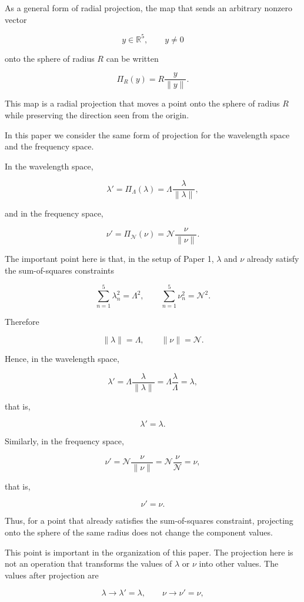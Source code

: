 \documentclass[
]{article}
\begin{document}
As a general form of radial projection, the map that sends an arbitrary
nonzero vector

\[
y\in\mathbb{R}^5,\qquad y\ne0
\]

onto the sphere of radius \(R\) can be written

\[
\Pi_R(y)=R\frac{y}{\|y\|} .
\]

This map is a radial projection that moves a point onto the sphere of
radius \(R\) while preserving the direction seen from the origin.

In this paper we consider the same form of projection for the wavelength
space and the frequency space.

In the wavelength space,

\[
\lambda'=\Pi_\Lambda(\lambda)
=
\Lambda\frac{\lambda}{\|\lambda\|} ,
\]

and in the frequency space,

\[
\nu'=\Pi_{\mathcal{N}}(\nu)
=
\mathcal{N}\frac{\nu}{\|\nu\|} .
\]

The important point here is that, in the setup of Paper 1, \(\lambda\)
and \(\nu\) already satisfy the sum-of-squares constraints

\[
\sum_{n=1}^{5}\lambda_n^2=\Lambda^2,
\qquad
\sum_{n=1}^{5}\nu_n^2=\mathcal{N}^2 .
\]

Therefore

\[
\|\lambda\|=\Lambda,
\qquad
\|\nu\|=\mathcal{N} .
\]

Hence, in the wavelength space,

\[
\lambda'
=
\Lambda\frac{\lambda}{\|\lambda\|}
=
\Lambda\frac{\lambda}{\Lambda}
=
\lambda ,
\]

that is,

\[
\boxed{\lambda'=\lambda} .
\]

Similarly, in the frequency space,

\[
\nu'
=
\mathcal{N}\frac{\nu}{\|\nu\|}
=
\mathcal{N}\frac{\nu}{\mathcal{N}}
=
\nu ,
\]

that is,

\[
\boxed{\nu'=\nu} .
\]

Thus, for a point that already satisfies the sum-of-squares constraint,
projecting onto the sphere of the same radius does not change the
component values.

This point is important in the organization of this paper. The
projection here is not an operation that transforms the values of
\(\lambda\) or \(\nu\) into other values. The values after projection
are

\[
\lambda\to\lambda'=\lambda,
\qquad
\nu\to\nu'=\nu ,
\]
\end{document}
